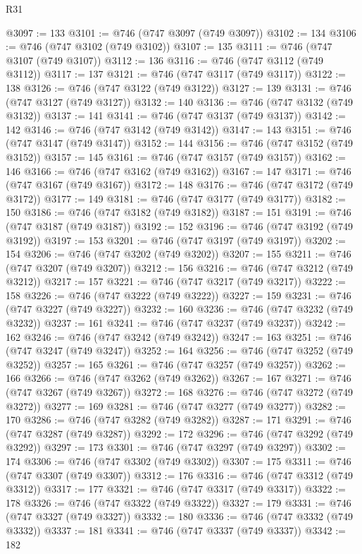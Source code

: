 \begin{lexlean}{R31}
\begin{coremodule}
@3097 := 133
@3101 := @746 (@747 @3097 (@749 @3097))
@3102 := 134
@3106 := @746 (@747 @3102 (@749 @3102))
@3107 := 135
@3111 := @746 (@747 @3107 (@749 @3107))
@3112 := 136
@3116 := @746 (@747 @3112 (@749 @3112))
@3117 := 137
@3121 := @746 (@747 @3117 (@749 @3117))
@3122 := 138
@3126 := @746 (@747 @3122 (@749 @3122))
@3127 := 139
@3131 := @746 (@747 @3127 (@749 @3127))
@3132 := 140
@3136 := @746 (@747 @3132 (@749 @3132))
@3137 := 141
@3141 := @746 (@747 @3137 (@749 @3137))
@3142 := 142
@3146 := @746 (@747 @3142 (@749 @3142))
@3147 := 143
@3151 := @746 (@747 @3147 (@749 @3147))
@3152 := 144
@3156 := @746 (@747 @3152 (@749 @3152))
@3157 := 145
@3161 := @746 (@747 @3157 (@749 @3157))
@3162 := 146
@3166 := @746 (@747 @3162 (@749 @3162))
@3167 := 147
@3171 := @746 (@747 @3167 (@749 @3167))
@3172 := 148
@3176 := @746 (@747 @3172 (@749 @3172))
@3177 := 149
@3181 := @746 (@747 @3177 (@749 @3177))
@3182 := 150
@3186 := @746 (@747 @3182 (@749 @3182))
@3187 := 151
@3191 := @746 (@747 @3187 (@749 @3187))
@3192 := 152
@3196 := @746 (@747 @3192 (@749 @3192))
@3197 := 153
@3201 := @746 (@747 @3197 (@749 @3197))
@3202 := 154
@3206 := @746 (@747 @3202 (@749 @3202))
@3207 := 155
@3211 := @746 (@747 @3207 (@749 @3207))
@3212 := 156
@3216 := @746 (@747 @3212 (@749 @3212))
@3217 := 157
@3221 := @746 (@747 @3217 (@749 @3217))
@3222 := 158
@3226 := @746 (@747 @3222 (@749 @3222))
@3227 := 159
@3231 := @746 (@747 @3227 (@749 @3227))
@3232 := 160
@3236 := @746 (@747 @3232 (@749 @3232))
@3237 := 161
@3241 := @746 (@747 @3237 (@749 @3237))
@3242 := 162
@3246 := @746 (@747 @3242 (@749 @3242))
@3247 := 163
@3251 := @746 (@747 @3247 (@749 @3247))
@3252 := 164
@3256 := @746 (@747 @3252 (@749 @3252))
@3257 := 165
@3261 := @746 (@747 @3257 (@749 @3257))
@3262 := 166
@3266 := @746 (@747 @3262 (@749 @3262))
@3267 := 167
@3271 := @746 (@747 @3267 (@749 @3267))
@3272 := 168
@3276 := @746 (@747 @3272 (@749 @3272))
@3277 := 169
@3281 := @746 (@747 @3277 (@749 @3277))
@3282 := 170
@3286 := @746 (@747 @3282 (@749 @3282))
@3287 := 171
@3291 := @746 (@747 @3287 (@749 @3287))
@3292 := 172
@3296 := @746 (@747 @3292 (@749 @3292))
@3297 := 173
@3301 := @746 (@747 @3297 (@749 @3297))
@3302 := 174
@3306 := @746 (@747 @3302 (@749 @3302))
@3307 := 175
@3311 := @746 (@747 @3307 (@749 @3307))
@3312 := 176
@3316 := @746 (@747 @3312 (@749 @3312))
@3317 := 177
@3321 := @746 (@747 @3317 (@749 @3317))
@3322 := 178
@3326 := @746 (@747 @3322 (@749 @3322))
@3327 := 179
@3331 := @746 (@747 @3327 (@749 @3327))
@3332 := 180
@3336 := @746 (@747 @3332 (@749 @3332))
@3337 := 181
@3341 := @746 (@747 @3337 (@749 @3337))
@3342 := 182

\end{coremodule}
\end{lexlean}
